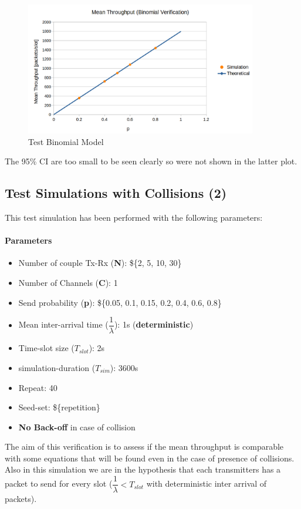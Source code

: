 \begin{figure}[H]
	\centering
	\includegraphics[width=0.9\textwidth]{img/plotTheoreticalMeanBinomial.png}
	\caption{Test Binomial Model}
\end{figure}

The 95\% CI are too small to be seen clearly so were not shown in the latter plot. 

\subsection{Test Simulations with Collisions (2)}
This test simulation has been performed with the following parameters:
\paragraph{Parameters}
\begin{itemize}
	\item Number of couple Tx-Rx (\textbf{N}): \$\{2, 5, 10, 30\}
	\item Number of Channels (\textbf{C}): 1
	\item Send probability (\textbf{p}): \$\{0.05, 0.1, 0.15, 0.2, 0.4, 0.6, 0.8\}
	\item Mean inter-arrival time ($\dfrac{1}{\lambda}$): 1s (\textbf{deterministic}) 
	\item Time-slot size ($T_{slot}$): 2s 
	\item simulation-duration ($T_{sim}$): 3600s 
	\item Repeat: 40
	\item Seed-set: \$\{repetition\}
	\item \textbf{No Back-off} in case of collision
\end{itemize}

\noindent The aim of this verification is to assess if the mean throughput is comparable with some equations that will be found even in the case of presence of collisions. Also in this simulation we are in the hypothesis that each transmitters has a packet to send for every slot ($\dfrac{1}{\lambda} < T_{slot}$ with deterministic inter arrival of packets).\\


